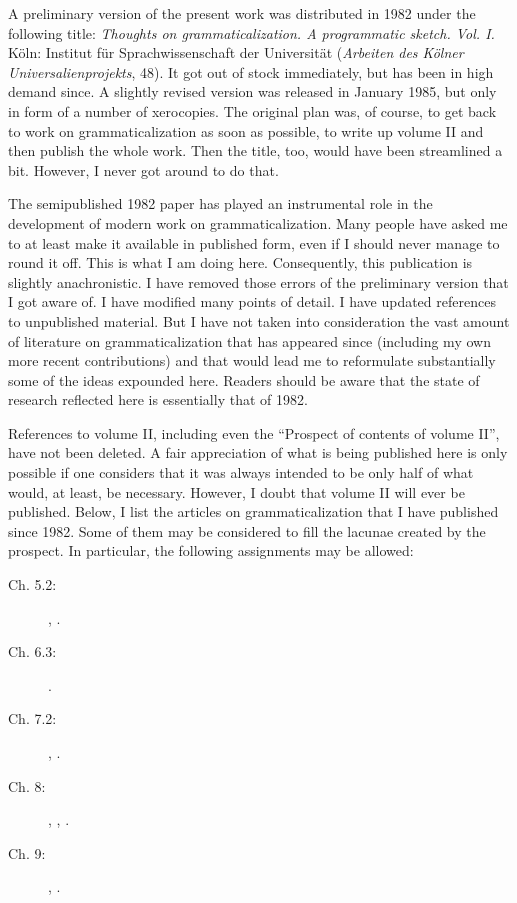 \label{95preface}

A preliminary version of the present work was distributed in 1982 under the following title: \textit{Thoughts on grammaticalization. A programmatic sketch. Vol. I.} Köln: Institut für Sprachwissenschaft der Universität (\textit{Arbeiten des Kölner Universalienprojekts}, 48). It got out of stock immediately, but has been in high demand since. A slightly revised version was released in January 1985, but only in form of a number of xerocopies. The original plan was, of course, to get back to work on grammaticalization as soon as possible, to write up volume II and then publish the whole work. Then the title, too, would have been streamlined a bit. However, I never got around to do that.

The semipublished 1982 paper has played an instrumental role in the development of modern work on grammaticalization. Many people have asked me to at least make it available in published form, even if I should never manage to round it off. This is what I am doing here. Consequently, this publication is slightly anachronistic. I have removed those errors of the preliminary version that I got aware of. I have modified many points of detail. I have updated references to unpublished material. But I have not taken into consideration the vast amount of literature on grammaticalization that has appeared since (including my own more recent contributions) and that would lead me to reformulate substantially some of the ideas expounded here. Readers should be aware that the state of research reflected here is essentially that of 1982.

References to volume II, including even the ``Prospect of contents of volume II'', have not been deleted. A fair appreciation of what is being published here is only possible if one considers that it was always intended to be only half of what would, at least, be necessary. However, I doubt that volume II will ever be published. Below, I list the articles on grammaticalization that I have published since 1982. Some of them may be considered to fill the lacunae created by the prospect. In particular, the following assignments may be allowed:

\begin{description}
\item[Ch. 5.2:]  \citet{Lehmann1989a}, \citet{Lehmann2002}.

\item[Ch. 6.3:]  \citet{Lehmann1989b}.

\item[Ch. 7.2:]  \citet{Lehmann1985b}, \citet{Lehmann1986}.

\item[Ch. 8:]    \citet{Lehmann1985a}, \citet{Lehmann1987}, \citet{Lehmann1992}.

\item[Ch. 9:]    \citet{Lehmann1993}, \citet{Lehmann1995}.
\end{description}


